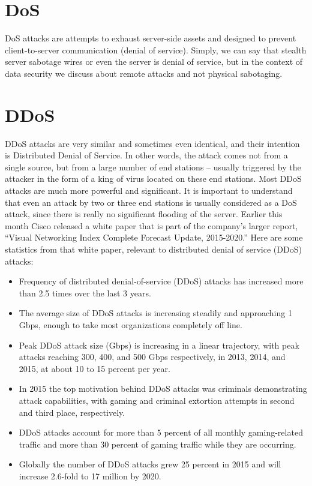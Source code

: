 \documentclass{report}
\begin{document}
\section {DoS}
\hfill \break DoS attacks are attempts to exhaust server-side assets and designed to prevent client-to-server communication (denial of service). Simply, we can say that stealth server sabotage wires or even the server is denial of service, but in the context of data security we discuss about remote attacks and not physical sabotaging.
\section {DDoS}
\hfill \break DDoS attacks are very similar and sometimes even identical, and their intention is Distributed Denial of Service. In other words, the attack comes not from a single source, but from a large number of end stations – usually triggered by the attacker in the form of a king of virus located on these end stations. Most DDoS attacks are much more powerful and significant. It is important to understand that even an attack by two or three end stations is usually considered as a DoS attack, since there is really no significant flooding of the server.
\hfill \break Earlier this month Cisco released a white paper that \cite{corero} is part of the company’s larger report, “Visual Networking Index Complete Forecast Update, 2015-2020.” Here are some statistics from that white paper, relevant to distributed denial of service (DDoS) attacks:
\begin{itemize}
\item Frequency of distributed denial-of-service (DDoS) attacks has increased more than 2.5 times over the last 3 years.
\item	The average size of DDoS attacks is increasing steadily and approaching 1 Gbps, enough to take most organizations completely off line.
\item	Peak DDoS attack size (Gbps) is increasing in a linear trajectory, with peak attacks reaching 300, 400, and 500 Gbps respectively, in 2013, 2014, and 2015, at about 10 to 15 percent per year.
\item	In 2015 the top motivation behind DDoS attacks was criminals demonstrating attack capabilities, with gaming and criminal extortion attempts in second and third place, respectively.
\item	DDoS attacks account for more than 5 percent of all monthly gaming-related traffic and more than 30 percent of gaming traffic while they are occurring.
\item	Globally the number of DDoS attacks grew 25 percent in 2015 and will increase 2.6-fold to 17 million by 2020.
\end{itemize}
\end{document}
